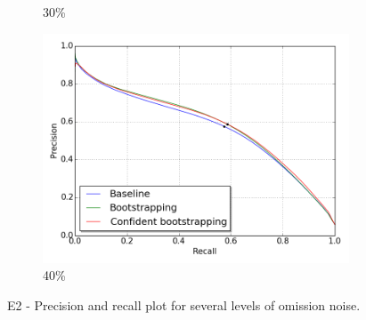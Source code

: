 \begin{figure}[H]
\begin{subfigure}{0.31\textwidth}
\caption{ 30\%} \label{fig:app_E2_3_pr}
\vspace{-0.1cm} %
\end{subfigure}
\hspace*{\fill} %
\begin{subfigure}{0.31\textwidth}
\includegraphics[width=\textwidth]{figs/E2/pr_4.png}
\caption{40\%} \label{fig:app_E2_4_pr}
\vspace{-0.1cm} %
\end{subfigure}
\vspace{-0.6\baselineskip}
\caption{E2 - Precision and recall plot for several levels of omission noise.} \label{fig:E2_all_pr}
\end{figure}
\vspace{-0.7cm}
